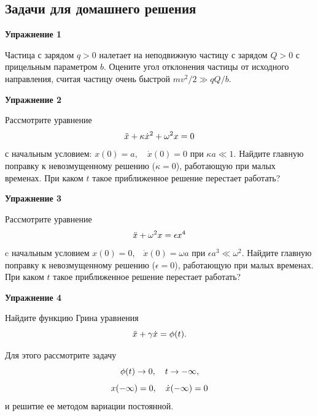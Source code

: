 \documentclass[a4paper,12pt]{article}
\begin{document}
\subsection*{Задачи для домашнего решения}

\noindent \textbf{Упражнение 1}

\noindent Частица с зарядом $q>0$ налетает на неподвижную частицу с зарядом $Q>0$ с прицельным параметром $b$. Оцените угол отклонения частицы от исходного направления, считая частицу очень быстрой $mv^{2}/2\gg qQ/b$.

\vspace{15pt}
\noindent \textbf{Упражнение 2}

\noindent Рассмотрите уравнение
\begin{equation}\notag
\ddot{x}+\kappa\dot{x}^{2}+\omega^{2}x	=0
\end{equation}
\noindent с начальным условием: $x(0)=a,\quad\dot{x}(0)=0$ при $\kappa a\ll 1$.
\noindent Найдите главную поправку к невозмущенному решению ($\kappa=0$), работающую при малых временах. При каком $t$ такое приближенное решение перестает работать?

\vspace{15pt}
\noindent \textbf{Упражнение 3}

\noindent Рассмотрите уравнение
\begin{equation}\notag
\ddot{x}+\omega^{2}x	=\epsilon x^{4}
\end{equation}
\noindent c начальным условием $x(0)=0$,$\quad\dot{x}(0)=\omega a$ при $\epsilon a^{3}\ll\omega^{2}$.
\noindent Найдите главную поправку к невозмущенному решению ($\epsilon=0$), работающую при малых временах. При каком $t$ такое приближенное решение перестает работать?

\vspace{15pt}
\noindent \textbf{Упражнение 4}

\noindent Найдите функцию Грина уравнения
\begin{equation}\notag
\ddot{x}+\gamma\dot{x}	=\phi(t).
\end{equation}

\noindent Для этого рассмотрите задачу
\begin{equation}\notag
\phi(t)	\rightarrow0,\quad t\rightarrow-\infty,
\end{equation}
\begin{equation}\notag
x(-\infty)	=0,\quad\dot{x}(-\infty)=0
\end{equation}
и решитие ее методом вариации постоянной.
\end{document}
